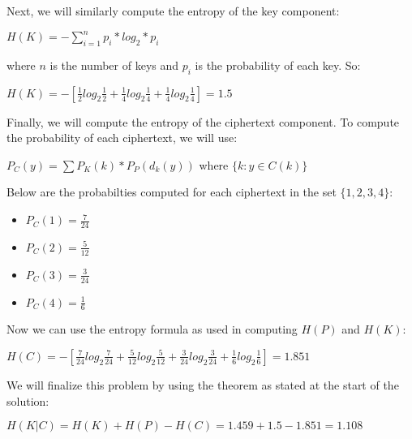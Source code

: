\documentclass[11pt]{article}
\begin{document}
Next, we will similarly compute the entropy of the key component:

\begin{center}
$H(K) = - \sum_{i=1}^{n} p_i * log_2 * p_i $
\end{center}
where $n$ is the number of keys and $p_i$ is the probability of each key. So:
\begin{center}
$H(K) = -[\frac{1}{2} log_2 \frac{1}{2} + \frac{1}{4} log_2 \frac{1}{4} + \frac{1}{4} log_2 \frac{1}{4}] = 1.5$
\end{center}

Finally, we will compute the entropy of the ciphertext component. To compute the probability of each ciphertext, we will use:
\begin{center}
$P_C(y) = \sum{}{} P_K(k) * P_P(d_k(y))$ where $\{k: y\in C(k)\}$
\end{center}
Below are the probabilties computed for each ciphertext in the set $\{1, 2, 3, 4\}$:
\begin{itemize}
\item $P_C(1) = \frac{7}{24}$
\item $P_C(2) = \frac{5}{12}$
\item $P_C(3) = \frac{3}{24}$
\item $P_C(4) = \frac{1}{6}$
\end{itemize}
Now we can use the entropy formula as used in computing $H(P)$ and $H(K)$:

\begin{center}
$H(C) = -[\frac{7}{24} log_2 \frac{7}{24} + \frac{5}{12} log_2 \frac{5}{12} + \frac{3}{24} log_2 \frac{3}{24} + \frac{1}{6} log_2 \frac{1}{6}] = 1.851$
\end{center}

We will finalize this problem by using the theorem as stated at the start of the solution:
\begin{center}
$H(K|C) = H(K) + H(P) - H(C) = 1.459 + 1.5 - 1.851 = 1.108$
\end{center}
\end{document}
